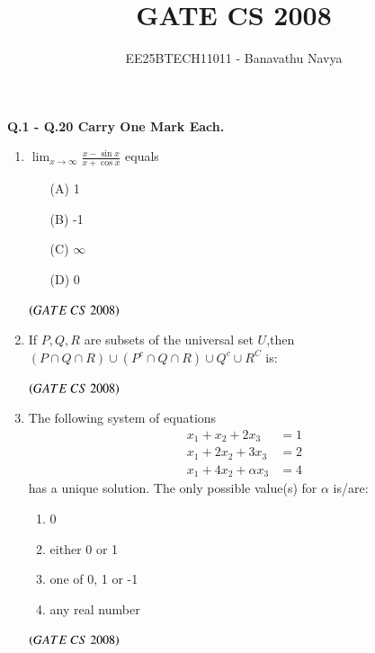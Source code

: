 \documentclass[journal, onecolumn]{IEEEtran}
\numberwithin{equation}{enumi}
\numberwithin{figure}{enumi}
\begin{document}

\vspace{3cm}

\title{GATE CS 2008}
\author{EE25BTECH11011 - Banavathu Navya}
\maketitle

\begin{center}
 \textbf{Q.1 - Q.20 Carry One Mark Each.}
\end{center}
\begin{enumerate}
    \item $\displaystyle \lim_{x \to \infty}\frac{x - \sin x}{x+ \cos x}$ equals
\begin{multicols}{4}
\begin{itemize}
    \item[(A)] 1
    \item[(B)] -1
    \item[(C)] $\infty$
    \item[(D)] 0
\end{itemize}
\end{multicols}
\hfill $\left(GATE\ CS\  2008\right)$

\item If \(P, Q, R\) are subsets of the universal set \(U\),then  \((P \cap Q \cap R) \cup (P^c \cap Q \cap R) \cup Q^c \cup R^C\) is:
\vspace{-1em}%
\begin{enumerate}
\end{enumerate}
\hfill $\left(GATE\ CS\  2008\right)$

\item The following system of equations
\[
\begin{aligned}
x_1 + x_2 + 2x_3 &= 1 \\
x_1 + 2x_2 + 3x_3 &= 2 \\
x_1 + 4x_2 + \alpha x_3 &= 4
\end{aligned}
\]
has a unique solution. The only possible value(s) for \(\alpha\) is/are:
 \vspace{-0.5em}%
\begin{multicols}{2}
\begin{enumerate}
    \item 0  
    \item either 0 or 1  
    \item one of 0, 1 or -1  
    \item any real number
\end{enumerate}
\end{multicols}
\hfill $\left(GATE\ CS\  2008\right)$


\end{enumerate}
\end{document}
